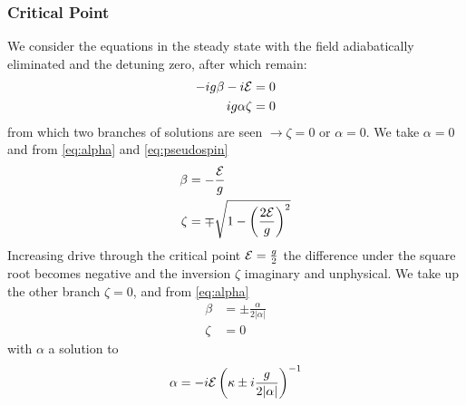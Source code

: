 \subsubsection{Critical Point}
We consider the equations in the steady state with the field adiabatically eliminated and the detuning zero, after which remain:
\begin{align}
	-ig \beta -i \mathcal{E} &= 0 \\
	ig\alpha \zeta &= 0
\end{align}
from which two branches of solutions are seen $\rightarrow \zeta = 0$ or $\alpha = 0$. We take $\alpha = 0$ and from \cref{eq:alpha} and \cref{eq:pseudospin}
\begin{align}
	\beta &= -\frac{\mathcal{E}}{g} \\
	\zeta &= \mp \sqrt{1 - \left( \frac{2\mathcal{E}}{g} \right)^2}
\end{align}
Increasing drive through the critical point $\mathcal{E} = \frac{g}{2}$ the difference under the square root becomes negative and the inversion $\zeta$ imaginary and unphysical. We take up the other branch $\zeta = 0$, and from \cref{eq:alpha}
\begin{align}
	\beta &= \pm \frac{\alpha}{2|\alpha|} \\
	\zeta &= 0
\end{align}
with $\alpha$ a solution to
\begin{equation}
	\alpha = -i \mathcal{E}\left ( \kappa \pm i \frac{g}{2|\alpha|} \right )^{-1}
	\label{eq:alphacondnotdet}
\end{equation}

